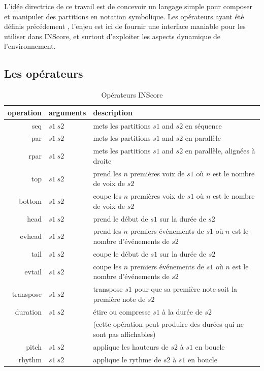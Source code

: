 \documentclass{article}
\begin{document}
L'idée directrice de ce travail est de concevoir un langage simple pour composer et manipuler des partitions en notation symbolique. Les opérateurs ayant été définis précédement \cite{fober12b}, l'enjeu est ici de fournir une interface maniable pour les utiliser dans INScore, et surtout d'exploiter les aspects dynamique de l'environnement.

\subsection{Les opérateurs}

\begin{table}[htdp]
\begin{center}
\begin{tabular}{rll}
\hline
operation & arguments		&	description \\
\hline
seq 	&	$s1\ s2$		& mets les partitions $s1$ and $s2$ en séquence \\
par 	&	$s1\ s2$		& mets les partitions $s1$ and $s2$ en parallèle \\ 
rpar	&	$s1\ s2$		& mets les partitions $s1$ and $s2$ en parallèle, alignées à droite \\
top 	&	$s1\ s2$ 	& prend les $n$ premières voix de $s1$ où $n$ est le nombre de voix de $s2$ \\
bottom 	&	$s1\ s2$ 	& coupe les $n$ premières voix de $s1$ où $n$ est le nombre de voix de $s2$ \\
head	& 	$s1\ s2$	& prend le début de $s1$ sur la durée de $s2$ \\
evhead 	&	$s1\ s2$	& prend les $n$ premiers événements de $s1$ où $n$ est le nombre d'événements de $s2$ \\
tail	&	$s1\ s2$ 	& coupe le début de $s1$ sur la durée de $s2$ \\
evtail 	&	$s1\ s2$ 	& coupe les $n$ premiers événements de $s1$ où $n$ est le nombre d'événements de $s2$ \\
transpose 	&	$s1\ s2$	& transpose $s1$ pour que sa première note soit la première note de $s2$ \\
duration 	&	$s1\ s2$	& étire ou compresse $s1$ à la durée de $s2$  \\
			& 	& 	(cette opération peut produire des durées qui ne sont pas affichables) \\
pitch 	&	$s1\ s2$	& applique les hauteurs de $s2$ à $s1$ en boucle \\
rhythm 	&	$s1\ s2$	& applique le rythme de $s2$ à $s1$ en boucle \\
\hline
\end{tabular}
\end{center}

\caption{Opérateurs INScore}
\label{operations}
\end{table}
\end{document}
